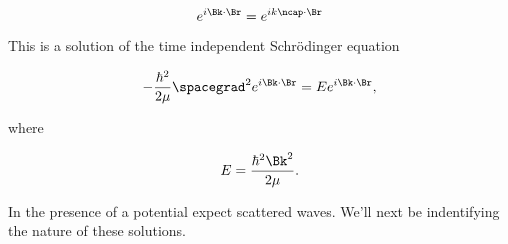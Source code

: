 \begin{equation}\label{eqn:qmTwoL22:510}
e^{i \Bk \cdot \Br} = e^{i k \ncap \cdot \Br}
\end{equation}

This is a solution of the time independent Schr\"{o}dinger equation

\begin{equation}\label{eqn:qmTwoL22:530}
-\frac{\hbar^2}{2 \mu} \spacegrad^2 e^{i \Bk \cdot \Br} 
= E
e^{i \Bk \cdot \Br},
\end{equation}

where

\begin{equation}\label{eqn:qmTwoL22:550}
E = \frac{\hbar^2 \Bk^2}{2 \mu}.
\end{equation}

In the presence of a potential expect scattered waves.  We'll next be indentifying the nature of these solutions.

\EndArticle
